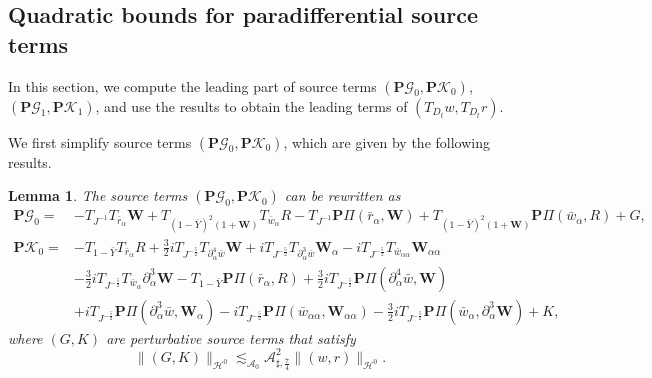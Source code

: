 \documentclass[10pt]{amsart}
\newtheorem{lemma}[theorem]{Lemma}
\theoremstyle{remark}
\theoremstyle{definition}
\numberwithin{equation}{section}
\newcommand{\p}{\partial}
\renewcommand{\H}{{\mathcal H }}
\newcommand{\al}{\alpha}
\newcommand{\f}{\frac}
\newcommand{\bw}{\mathbf{W}}
\newcommand{\nP}{{\mathbf P}}
\newcommand{\CalAZ}{{\mathcal{A}_0}}
\newcommand{\ASSharp}{{\mathcal{A}_{\sharp,\frac{7}{4}}^2}}
\begin{document}
\subsection{Quadratic bounds for paradifferential source terms}
In this section, we compute the leading part of source terms $(\nP\mathcal{G}_0, \nP\mathcal{K}_0)$, $(\nP\mathcal{G}_1, \nP\mathcal{K}_1)$, and use the results to obtain the leading terms of $(T_{D_t}w, T_{D_t }r)$.

We first simplify source terms $(\nP\mathcal{G}_0, \nP\mathcal{K}_0)$, which are given by the following results.
\begin{lemma} \label{t:PGKZeroExp}
The source terms $(\nP\mathcal{G}_0, \nP\mathcal{K}_0)$ can be rewritten as
\begin{align*}
 \nP\mathcal{G}_0 =&  -T_{J^{-1}}T_{\bar{r}_\alpha}\bw +  T_{(1-\bar{Y})^2(1+\bw)}T_{\bar{w}_\alpha} R - T_{J^{-1}} \nP \Pi(\bar{r}_\alpha, \bw) +  T_{(1-\bar{Y})^2(1+\bw)} \nP \Pi(\bar{w}_\alpha, R) + G ,\\
  \nP\mathcal{K}_0 =& -T_{1-\bar{Y}}T_{\bar{r}_\alpha} R  +\f32 i T_{J^{-\f52}} T_{\p^4_{\al}\bar{w}}\bw + iT_{J^{-\f52}}T_{\p^3_{\al}\bar{w}}\bw_\al -iT_{J^{-\f52}} T_{\bar{w}_{\al\al}}\bw_{\al\al}\\
  &- \f32iT_{J^{-\f52}}T_{\bar{w}_{\al}} \p^3_{\al}\bw- T_{1-\bar{Y}}\nP\Pi(\bar{r}_\alpha, R)+\f32 iT_{J^{-\f52}} \nP \Pi(\p^4_{\al}\bar{w},\bw) \\
  &+ iT_{J^{-\f52}} \nP \Pi(\p^3_{\al}\bar{w}, \bw_\al)- iT_{J^{-\f52}}\nP \Pi(\bar{w}_{\al\al},\bw_{\al\al})- \f32 i T_{J^{-\f52}}\nP \Pi(\bar{w}_{\al},\p^3_{\al}\bw) + K,
 \end{align*}
where $(G,K)$ are perturbative source terms that satisfy 
\begin{equation} \label{HalfGK}
 \| (G,K)\|_{\H^0}\lesssim_{\CalAZ}  \ASSharp \| (w,r)\|_{\H^0}. 
\end{equation} 
\end{lemma}
\end{document}
